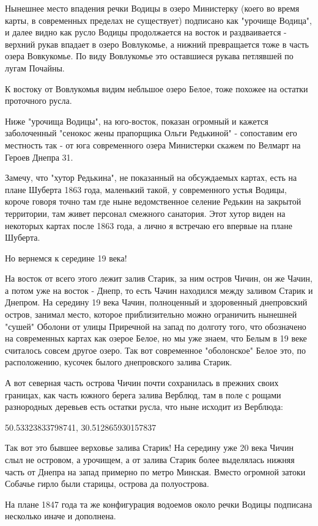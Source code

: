 Нынешнее место впадения речки Водицы в озеро Министерку (коего во время карты, в современных пределах не существует) подписано как "урочище Водица", и далее видно как русло Водицы продолжается на восток и раздваивается - верхний рукав впадает в озеро Вовлукомье, а нижний превращается тоже в часть озера Вовкукомье. По виду Вовлукомье это оставшиеся рукава петлявшей по лугам Почайны.

К востоку от Вовлукомья видим небльшое озеро Белое, тоже похожее на остатки проточного русла.

Ниже "урочища Водицы", на юго-восток, показан огромный и кажется заболоченный "сенокос жены прапорщика Ольги Редькиной" - сопоставим его местность так - от юга современного озера Министерки скажем по Велмарт на Героев Днепра 31.

Замечу, что "хутор Редькина", не показанный на обсуждаемых картах, есть на плане Шуберта 1863 года, маленький такой, у современного устья Водицы, короче говоря точно там где ныне ведомственное селение Редькин на закрытой территории, там живет персонал смежного санатория. Этот хутор виден на некоторых картах после 1863 года, а лично я встречаю его впервые на плане Шуберта.

Но вернемся к середине 19 века!

На восток от всего этого лежит залив Старик, за ним остров Чичин, он же Чачин, а потом уже на восток - Днепр, то есть Чачин находился между заливом Старик и Днепром. На середину 19 века Чачин, полноценный и здоровенный днепровский остров, занимал место, которое приблизительно можно ограничить нынешней "сушей" Оболони от улицы Приречной на запад по долготу того, что обозначено на современных картах как озерое Белое, но мы уже знаем, что Белым в 19 веке считалось совсем другое озеро. Так вот современное "оболонское" Белое это, по расположению, кусочек былого днепровского залива Старик.

А вот северная часть острова Чичин почти сохранилась в прежних своих границах, как часть южного берега залива Верблюд, там в поле с рощами разнородных деревьев есть остатки русла, что ныне исходит из Верблюда:

50.53323833798741, 30.512865930157837 

Так вот это бывшее верховье залива Старик!
На середину уже 20 века Чичин слыл не островом, а урочищем, а от залива Старик более выделялась нижняя часть от Днепра на запад примерно по метро Минская. Вместо огромной затоки Собачье гирло были старицы, острова да полуострова.

На плане 1847 года та же конфигурация водоемов около речки Водицы подписана несколько иначе и дополнена. 

